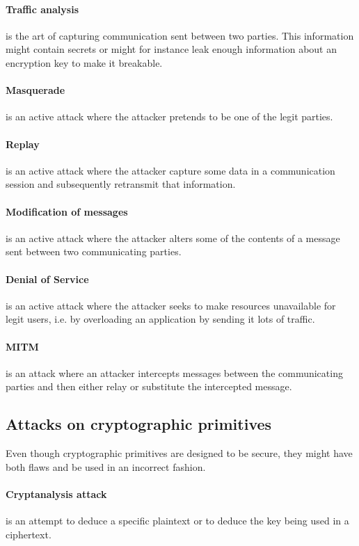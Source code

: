 \documentclass[pdftex,english,10pt,b5paper,twoside]{book}
\begin{document}
\paragraph{Traffic analysis} is the art of capturing communication sent between
two parties. This information might contain secrets or might for instance leak
enough information about an encryption key to make it breakable.

\paragraph{Masquerade} is an active attack where the attacker pretends to be
one of the legit parties.

\paragraph{Replay} is an active attack where the attacker capture some data in
a communication session and subsequently retransmit that information.

\paragraph{Modification of messages} is an active attack where the attacker
alters some of the contents of a message sent between two communicating
parties.

\paragraph{Denial of Service} is an active attack where the attacker seeks to
make resources unavailable for legit users, i.e. by overloading an application
by sending it lots of traffic.

\paragraph{\acl{MITM}} is an attack where an attacker intercepts messages
between the communicating parties and then either relay or substitute the
intercepted message.

\subsection{Attacks on cryptographic primitives}
Even though cryptographic primitives are designed to be secure, they might have
both flaws and be used in an incorrect fashion.

\paragraph{Cryptanalysis attack} is an attempt to deduce a specific plaintext
or to deduce the key being used in a ciphertext.
\end{document}
